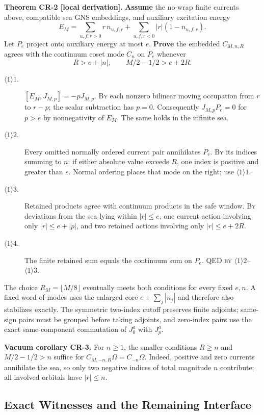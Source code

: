 \textbf{Theorem CR-2 [local derivation].}
\textbf{Assume} the no-wrap finite currents above, compatible sea GNS
embeddings, and auxiliary excitation energy
\[
 E_M=\sum_{u,f,r>0}r\,n_{u,f,r}
       +\sum_{u,f,r<0}|r|(1-n_{u,f,r}).
\]
Let $P_e$ project onto auxiliary energy at most $e$.
\textbf{Prove} the embedded $C_{M,n,R}$ agrees with the continuum coset
mode $C_n$ on $P_e$ whenever
\[
 R>e+|n|,\qquad M/2-1/2>e+2R.
\]
\begin{description}
\item[$\langle1\rangle1$.] $[E_M,J_{M,p}]=-pJ_{M,p}$.
\textsc{By} each nonzero bilinear moving occupation from $r$ to $r-p$;
the scalar subtraction has $p=0$. Consequently $J_{M,p}P_e=0$ for $p>e$
by nonnegativity of $E_M$. The same holds in the infinite sea.
\item[$\langle1\rangle2$.] Every omitted normally ordered current pair
annihilates $P_e$. \textsc{By} its indices summing to $n$: if either
absolute value exceeds $R$, one index is positive and greater than $e$.
Normal ordering places that mode on the right; use $\langle1\rangle1$.
\item[$\langle1\rangle3$.] Retained products agree with continuum
products in the safe window. \textsc{By} deviations from the sea lying
within $|r|\le e$, one current action involving only $|r|\le e+|p|$,
and two retained actions involving only $|r|\le e+2R$.
\item[$\langle1\rangle4$.] The finite retained sum equals the continuum
sum on $P_e$. QED \textsc{by} $\langle1\rangle2$--$\langle1\rangle3$.
\end{description}

The choice $R_M=\lfloor M/8\rfloor$ eventually meets both conditions for
every fixed $e,n$. A fixed word of modes uses the enlarged core
$e+\sum_j|n_j|$ and therefore also stabilizes exactly. The symmetric
two-index cutoff preserves finite adjoints; same-sign pairs must be grouped
before taking adjoints, and zero-index pairs use the exact same-component
commutation of $J_0^a$ with $J_p^a$.

\textbf{Vacuum corollary CR-3.} For $n\ge1$, the smaller conditions
$R\ge n$ and $M/2-1/2>n$ suffice for
$C_{M,-n,R}\Omega=C_{-n}\Omega$. Indeed, positive and zero currents
annihilate the sea, so only two negative indices of total magnitude $n$
contribute; all involved orbitals have $|r|\le n$.

\subsection{Exact Witnesses and the Remaining Interface}


